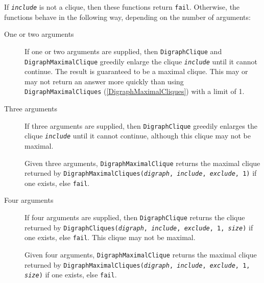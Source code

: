 \documentclass[a4paper,11pt]{report}
\begin{document}
{{{ If \mbox{\texttt{\mdseries\slshape include}} is not a clique, then these functions return \texttt{fail}. Otherwise, the functions behave in the following way, depending on the
number of arguments: 
\begin{description}
\item[{One or two arguments}]  If one or two arguments are supplied, then \texttt{DigraphClique} and \texttt{DigraphMaximalClique} greedily enlarge the clique \mbox{\texttt{\mdseries\slshape include}} until it cannot continue. The result is guaranteed to be a maximal clique.
This may or may not return an answer more quickly than using \texttt{DigraphMaximalCliques} (\ref{DigraphMaximalCliques}) with a limit of 1. 
\item[{Three arguments}]  If three arguments are supplied, then \texttt{DigraphClique} greedily enlarges the clique \mbox{\texttt{\mdseries\slshape include}} until it cannot continue, although this clique may not be maximal.

 Given three arguments, \texttt{DigraphMaximalClique} returns the maximal clique returned by \texttt{DigraphMaximalCliques(}\mbox{\texttt{\mdseries\slshape digraph}}\texttt{, }\mbox{\texttt{\mdseries\slshape include}}\texttt{, }\mbox{\texttt{\mdseries\slshape exclude}}\texttt{, 1)} if one exists, else \texttt{fail}. 
\item[{Four arguments}]  If four arguments are supplied, then \texttt{DigraphClique} returns the clique returned by \texttt{DigraphCliques(}\mbox{\texttt{\mdseries\slshape digraph}}\texttt{, }\mbox{\texttt{\mdseries\slshape include}}\texttt{, }\mbox{\texttt{\mdseries\slshape exclude}}\texttt{, 1, }\mbox{\texttt{\mdseries\slshape size}}\texttt{)} if one exists, else \texttt{fail}. This clique may not be maximal.

 Given four arguments, \texttt{DigraphMaximalClique} returns the maximal clique returned by \texttt{DigraphMaximalCliques(}\mbox{\texttt{\mdseries\slshape digraph}}\texttt{, }\mbox{\texttt{\mdseries\slshape include}}\texttt{, }\mbox{\texttt{\mdseries\slshape exclude}}\texttt{, 1, }\mbox{\texttt{\mdseries\slshape size}}\texttt{)} if one exists, else \texttt{fail}. 
\end{description}
 
}}}
\end{document}
